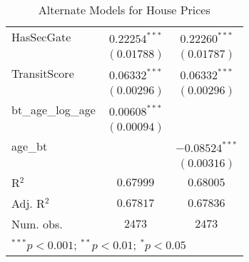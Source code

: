 \begin{table}
\begin{center}
\begin{tabular}{l c c}
HasSecGate        & $0.22254^{***}$  & $0.22260^{***}$  \\
                  & $(0.01788)$      & $(0.01787)$      \\
TransitScore      & $0.06332^{***}$  & $0.06332^{***}$  \\
                  & $(0.00296)$      & $(0.00296)$      \\
bt\_age\_log\_age & $0.00608^{***}$  &                  \\
                  & $(0.00094)$      &                  \\
age\_bt           &                  & $-0.08524^{***}$ \\
                  &                  & $(0.00316)$      \\
\hline
R$^2$             & $0.67999$        & $0.68005$        \\
Adj. R$^2$        & $0.67817$        & $0.67836$        \\
Num. obs.         & $2473$           & $2473$           \\
\hline
\multicolumn{3}{l}{\scriptsize{$^{***}p<0.001$; $^{**}p<0.01$; $^{*}p<0.05$}}
\end{tabular}
\caption{Alternate Models for House Prices}
\label{tab:reg_sq_horse_bt}
\end{center}
\end{table}

